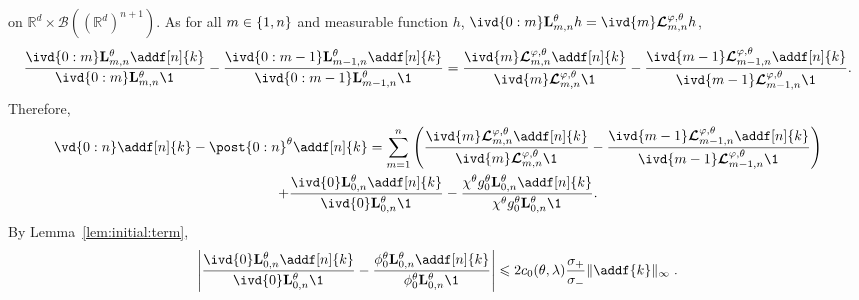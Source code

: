 \documentclass{article}
\begin{document}
on  $\mathbb{R}^d \times \mathcal{B}((\mathbb{R}^d)^{n+1})$. 
As for all $m \in \{ 1, n \}$ and measurable function $h$, $\ivd{0:m} \uk{m, n}{\parvec} h = \ivd{m} \retrokmod_{m, n} h$,  
$$
\frac{\ivd{0:m} \uk{m, n}{\parvec} \addf[n]{k}}{\ivd{0:m} \uk{m, n}{\parvec} \1_{}} - \frac{\ivd{0:m - 1} \uk{m - 1, n}{\parvec} \addf[n]{k}}{\ivd{0:m - 1} \uk{m - 1, n}{\parvec} \1_{}} 
= \frac{\ivd{m} \retrokmod_{m, n} \addf[n]{k}}{\ivd{m} \retrokmod_{m, n} \1_{}} - \frac{\ivd{m - 1} \retrokmod_{m - 1, n} \addf[n]{k}}{\ivd{m - 1} \retrokmod_{m - 1, n} \1_{}}. 
$$
Therefore,
\begin{multline}
\label{eq:error:decomp}
\vd{0:n} \addf[n]{k} - \post{0:n}^\parvec \addf[n]{k} = 
\sum_{m = 1}^n \left( \frac{\ivd{m} \retrokmod_{m, n} \addf[n]{k}}{\ivd{m} \retrokmod_{m, n} \1_{}} - \frac{\ivd{m - 1} \retrokmod_{m - 1, n} \addf[n]{k}}{\ivd{m - 1} \retrokmod_{m - 1, n} \1_{}} \right) \\ + \frac{\ivd{0} \uk{0, n}{\parvec} \addf[n]{k}}{\ivd{0} \uk{0, n}{\parvec} \1_{}} - \frac{\chi^\parvec \md{0}{\parvec}\uk{0, n}{\parvec} \addf[n]{k}}{\chi^\parvec\md{0}{\parvec}\uk{0, n}{\parvec} \1_{}}.
\end{multline}
By Lemma~\ref{lem:initial:term}, 
$$
\left|\frac{\ivd{0} \uk{0, n}{\parvec} \addf[n]{k}}{\ivd{0} \uk{0, n}{\parvec} \1_{}} - \frac{\phi^\parvec_0\uk{0, n}{\parvec} \addf[n]{k}}{\phi^\parvec_0\uk{0, n}{\parvec} \1_{}}\right|\leqslant 2c_0(\parvec,\parvar)\frac{\sigma_+}{\sigma_-}\|\addf{k}\|_\infty\eqsp.
$$
\end{document}
